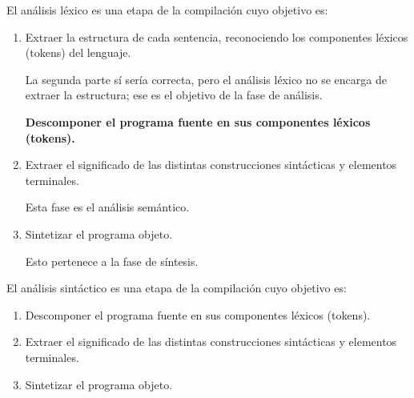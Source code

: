 \begin{ejercicio}\label{ej:3.Ejercicio4}
    El análisis léxico es una etapa de la compilación cuyo objetivo es:
    \begin{enumerate}[label=(\alph*)]
        \item Extraer la estructura de cada sentencia, reconociendo los componentes léxicos (tokens) del lenguaje.

        La segunda parte sí sería correcta, pero el análisis léxico no se encarga de extraer la estructura; ese es el objetivo de la fase de análisis.
        
        \myitem \textbf{Descomponer el programa fuente en sus componentes léxicos (tokens).}

        \item Extraer el significado de las distintas construcciones sintácticas y elementos terminales.

        Esta fase es el análisis semántico.
        
        \item Sintetizar el programa objeto.

        Esto pertenece a la fase de síntesis.
    \end{enumerate}
\end{ejercicio}

\begin{ejercicio}\label{ej:3.Ejercicio5}
    El análisis sintáctico es una etapa de la compilación cuyo objetivo es:
    \begin{enumerate}[label=(\alph*)]
        \myitem \textbf{Extraer la estructura de cada sentencia, reconociendo los componentes léxicos (tokens) del lenguaje}.
        \newline
        Es esta la única función del analizador sintáctico, el comprobar la correcta estructura de cada una de las sentencias del programa.
        \item Descomponer el programa fuente en sus componentes léxicos (tokens).
        \item Extraer el significado de las distintas construcciones sintácticas y elementos terminales.
        \item Sintetizar el programa objeto.
       
    \end{enumerate}
\end{ejercicio}

